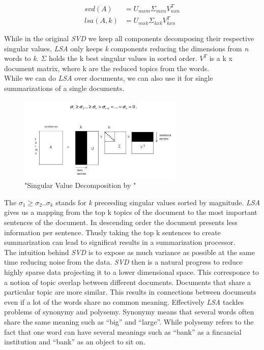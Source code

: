       \begin{align*}
        svd(A) &= U_{mxm}\Sigma_{mxn} V^{T}_{nxn} \\
        lsa(A, k) &= U_{mxk}\Sigma_{kxk} V^{T}_{kxn}
      \end{align*}

      While in the original \emph{SVD} we keep all components decomposing their respective singular values, \emph{LSA} only keeps \emph{k} components reducing the dimensions from \emph{n} words to \emph{k}. $\Sigma$ holds the k best singular values in sorted order. $V^{T}$ is a k x document matrix, where k are the reduced topics from the words.\\
      While we can do \emph{LSA} over documents, we can also use it for single summarizations of a single documents.

      \begin{figure}[h!]
        \centering
          \includegraphics[width=0.7\textwidth]{svd_lsa.png}
          \caption{"Singular Value Decomposition by \cite{SumLSASteinberger2004}"}
          \label{svd_lsa}
      \end{figure}

      The $\sigma_1 \geq \sigma_2..\sigma_k$ stands for \emph{k} preceeding singular values sorted by magnitude. \emph{LSA} gives us a mapping from the top k topics of the document to the most important sentences of the document. In descending order the document presents less information per sentence. Thusly taking the top k sentences to create summarization can lead to significat results in a summarization processor. \cite{SumLSASteinberger2004}\\

      The intuition behind \emph{SVD} is to expose as much variance as possible at the same time reducing noise from the data. \emph{SVD} then is a natural progress to reduce highly sparse data projecting it to a lower dimensional space. This corresponce to a notion of topic overlap between different documents.
      Documents that share a particular topic are more similar. This results in connections between documents even if a lot of the words share no common meaning. Effectively \emph{LSA} tackles problems of synonymy and polysemy. Synonymy means that several words often share the same meaning such as ``big'' and ``large''. While polysemy refers to the fact that one word can have several meanings such as ``bank'' as a fincancial institution and ``bank'' as an object to sit on.

